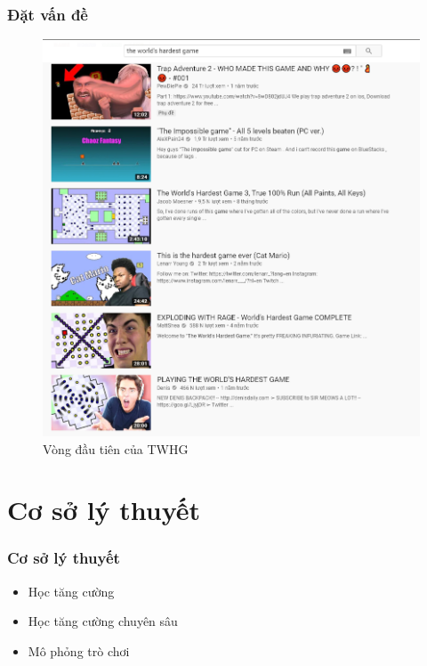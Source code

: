\documentclass{beamer}
\begin{document}
\begin{frame}
\frametitle{Đặt vấn đề}
\begin{figure}[h]
    \centering
    \includegraphics[scale=0.4]{photo/TWHG-react.png}
    \caption{Vòng đầu tiên của TWHG}
    \label{fig:my_label}
\end{figure}
\end{frame}

\section{Cơ sở lý thuyết}
\begin{frame}
\frametitle{Cơ sở lý thuyết}
\begin{itemize}
\item Học tăng cường
\item Học tăng cường chuyên sâu
\item Mô phỏng trò chơi
\end{itemize}
\end{frame}
\end{document}
